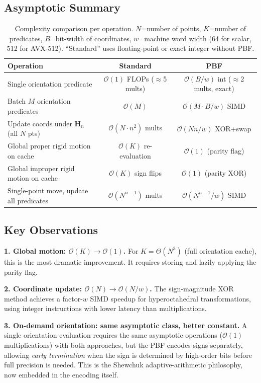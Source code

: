 \documentclass[11pt,letterpaper]{article}
\newcommand{\Hn}{\mathbf{H}_n}
\newcommand{\cO}{\mathcal{O}}
\newcommand{\wt}{w}       %
\begin{document}
\subsection{Asymptotic Summary}

\begin{table}[ht]
\centering
\caption{Complexity comparison per operation. $N$=number of points, $K$=number of
predicates, $B$=bit-width of coordinates, $\wt$=machine word width (64 for scalar,
512 for AVX-512). ``Standard'' uses floating-point or exact integer without PBF.}
\label{tab:complexity}
\begin{tabularx}{\textwidth}{Xcc}
\toprule
Operation & Standard & PBF \\
\midrule
Single orientation predicate & $\cO(1)$ FLOPs ($\approx$5 mults) & $\cO(B/\wt)$ int ($\approx$2 mults, exact) \\
Batch $M$ orientation predicates & $\cO(M)$ & $\cO(M\cdot B/\wt)$ SIMD \\
Update coords under $\Hn$ (all $N$ pts) & $\cO(N\cdot n^2)$ mults & $\cO(Nn/\wt)$ XOR+swap \\
Global proper rigid motion on cache & $\cO(K)$ re-evaluation & $\cO(1)$ (parity flag) \\
Global improper rigid motion on cache & $\cO(K)$ sign flips & $\cO(1)$ (parity XOR) \\
Single-point move, update all predicates & $\cO(N^{n-1})$ mults & $\cO(N^{n-1}/\wt)$ SIMD \\
\bottomrule
\end{tabularx}
\end{table}

\subsection{Key Observations}

\textbf{1. Global motion: $\cO(K)\to\cO(1)$.}  For $K=\Theta(N^3)$ (full orientation
cache), this is the most dramatic improvement.  It requires storing and lazily applying
the parity flag.

\textbf{2. Coordinate update: $\cO(N)\to\cO(N/\wt)$.}  The sign-magnitude XOR method
achieves a factor-$\wt$ SIMD speedup for hyperoctahedral transformations, using
integer instructions with lower latency than multiplications.

\textbf{3. On-demand orientation: same asymptotic class, better constant.}
A single orientation evaluation requires the same asymptotic operations ($\cO(1)$
multiplications) with both approaches, but the PBF encodes signs separately, allowing
\emph{early termination} when the sign is determined by high-order bits before full
precision is needed.  This is the Shewchuk adaptive-arithmetic philosophy, now embedded
in the encoding itself.
\end{document}
